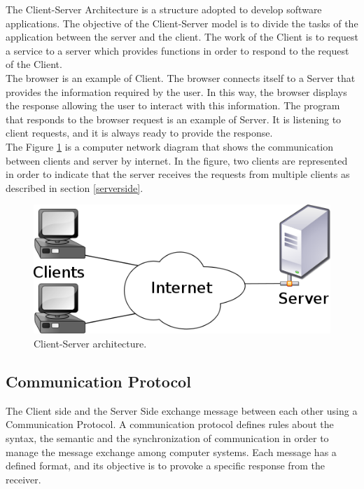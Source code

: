 \documentclass[a4paper]{report}
\begin{document}
The Client-Server Architecture is a structure adopted to develop software applications. The objective of the Client-Server model is to divide the tasks of the application between the server and the client. The work of the Client is to request a service to a server which provides functions in order to respond to the request of the Client.\\
The browser is an example of Client. The browser connects itself to a Server that provides the information required by the user. In this way, the browser displays the response allowing the user to interact with this information. The program that responds to the browser request is an example of Server. It is listening to client requests, and it is always ready to provide the response.\\
The Figure \ref{clientServer} is a computer network diagram that shows the communication between clients and server by internet. In the figure, two clients are represented in order to indicate that the server receives the requests from multiple clients as described in section \ref{serverside}. 

\begin{figure}[htb] 
\begin{center}
\includegraphics[scale=0.4]{figure/clientServer.png} 
\end{center}
\caption{Client-Server architecture.}
\label{clientServer}
\end{figure}

\subsection{Communication Protocol}

The Client side and the Server Side exchange message between each other using a Communication Protocol. A communication protocol defines rules about the syntax, the semantic and the synchronization of communication in order to manage the message exchange among computer systems.  Each message has a defined format, and its objective is to provoke a specific response from the receiver.
\end{document}
